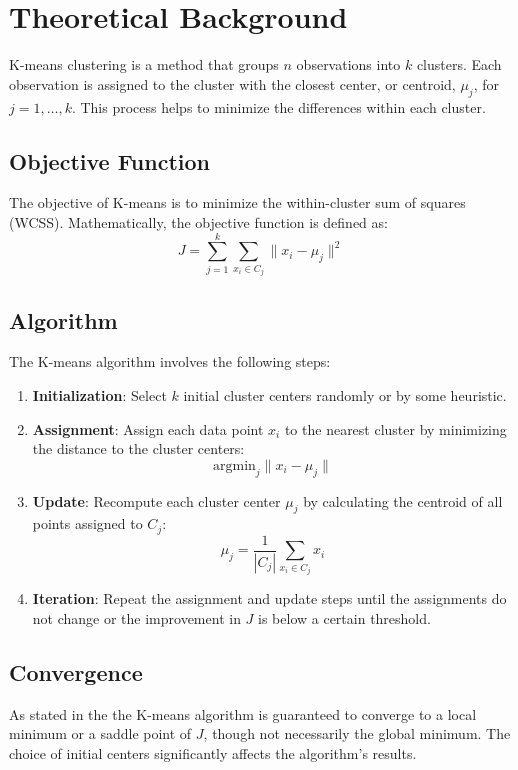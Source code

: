 \newpage
\section{Theoretical Background}

K-means clustering is a method that groups \( n \) observations into \( k \) clusters. Each observation is assigned to the cluster with the closest center, or centroid, \( \mu_j \), for \( j = 1, \ldots, k \). This process helps to minimize the differences within each cluster.


\subsection{Objective Function}
The objective of K-means is to minimize the within-cluster sum of squares (WCSS). Mathematically, the objective function is defined as:
\[
J = \sum_{j=1}^k \sum_{x_i \in C_j} \| x_i - \mu_j \|^2
\]

\subsection{Algorithm}
The K-means algorithm involves the following steps:
\begin{enumerate}
    \item \textbf{Initialization}: Select \( k \) initial cluster centers randomly or by some heuristic.
    \item \textbf{Assignment}: Assign each data point \( x_i \) to the nearest cluster by minimizing the distance to the cluster centers:
    \[
    \text{argmin}_j \| x_i - \mu_j \|
    \]
    \item \textbf{Update}: Recompute each cluster center \( \mu_j \) by calculating the centroid of all points assigned to \( C_j \):
    \[
    \mu_j = \frac{1}{|C_j|} \sum_{x_i \in C_j} x_i
    \]
    \item \textbf{Iteration}: Repeat the assignment and update steps until the assignments do not change or the improvement in \( J \) is below a certain threshold.
\end{enumerate}

\subsection{Convergence}
As stated in the \cite{IKOTUN2023178} the K-means algorithm is guaranteed to converge to a local minimum or a saddle point of \( J \), though not necessarily the global minimum. The choice of initial centers significantly affects the algorithm's results.
